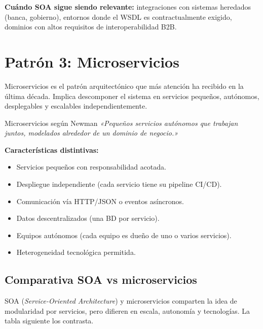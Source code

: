 \documentclass[11pt,a4paper,openany]{book}
\begin{document}
\textbf{Cuándo SOA sigue siendo relevante:} integraciones con
sistemas heredados (banca, gobierno), entornos donde el WSDL es
contractualmente exigido, dominios con altos requisitos de
interoperabilidad B2B.

\section{Patrón 3: Microservicios}

Microservicios es el patrón arquitectónico que más atención
ha recibido en la última década. Implica descomponer el sistema en
servicios pequeños, autónomos, desplegables y escalables
independientemente.


\begin{cajadefinicion}{Microservicios según Newman}
\emph{«Pequeños servicios autónomos que trabajan juntos, modelados
alrededor de un dominio de negocio.»} \cite{newman2021building}

\textbf{Características distintivas:}
\begin{itemize}
\item Servicios pequeños con responsabilidad acotada.
\item Despliegue independiente (cada servicio tiene su pipeline CI/CD).
\item Comunicación vía HTTP/JSON o eventos asíncronos.
\item Datos descentralizados (una BD por servicio).
\item Equipos autónomos (cada equipo es dueño de uno o varios servicios).
\item Heterogeneidad tecnológica permitida.
\end{itemize}
\end{cajadefinicion}

\subsection{Comparativa SOA vs microservicios}

SOA (\emph{Service-Oriented Architecture}) y microservicios
comparten la idea de modularidad por servicios, pero difieren en
escala, autonomía y tecnologías. La tabla siguiente los contrasta.
\end{document}
